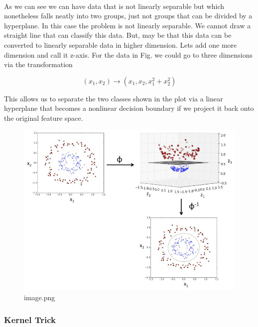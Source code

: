\documentclass[11pt]{article}
\begin{document}
    \begin{center}
    \end{center}
    { \hspace*{\fill} \\}
    
    As we can see we can have data that is not linearly separable but which
nonetheless falls neatly into two groups, just not groups that can be
divided by a hyperplane. In this case the problem is not linearly
separable. We cannot draw a straight line that can classify this data.
But, may be that this data can be converted to linearly separable data
in higher dimension. Lets add one more dimension and call it z-axis. For
the data in Fig. we could go to three dimensions via the transformation

\[(x_1, x_2) \rightarrow (x_1, x_2, x_1^2 + x_2^2)\]

This allows us to separate the two classes shown in the plot via a
linear hyperplane that becomes a nonlinear decision boundary if we
project it back onto the original feature space.

    \begin{figure}
\centering
\includegraphics{./pic/chapter-4-3_pic_3.png}
\caption{image.png}
\end{figure}

    \hypertarget{kernel-trick}{%
\subsubsection{Kernel Trick}\label{kernel-trick}}
\end{document}
